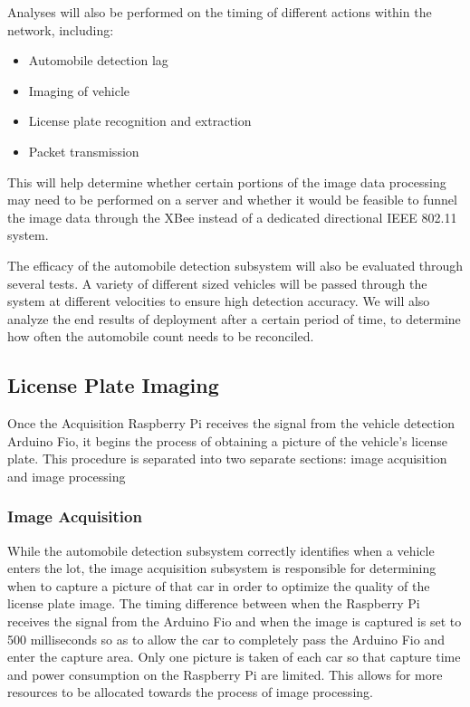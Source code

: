 \documentclass[11pt, oneside, fullpage, doublespace]{article}
\begin{document}
Analyses will also be performed on the timing of different actions within the network, including:
\begin{itemize}
\item Automobile detection lag
\item Imaging of vehicle
\item License plate recognition and extraction
\item Packet transmission
\end{itemize}
This will help determine whether certain portions of the image data processing may need to be performed on a server and whether it would be feasible to funnel the image data through the XBee instead of a dedicated directional IEEE 802.11 system.

The efficacy of the automobile detection subsystem will also be evaluated through several tests. A variety of different sized vehicles will be passed through the system at different velocities to ensure high detection accuracy. We will also analyze the end results of deployment after a certain period of time, to determine how often the automobile count needs to be reconciled.


\subsection{License Plate Imaging}
Once the Acquisition Raspberry Pi receives the signal from the vehicle detection Arduino Fio, it begins the process of obtaining a picture of the vehicle's license plate. This procedure is separated into two separate sections: image acquisition and image processing

\subsubsection{Image Acquisition}
While the automobile detection subsystem correctly identifies when a vehicle enters the lot, the image acquisition subsystem is responsible for determining when to capture a picture of that car in order to optimize the quality of the license plate image. The timing difference between when the Raspberry Pi receives the signal from the Arduino Fio and when the image is captured is set to 500 milliseconds so as to allow the car to completely pass the Arduino Fio and enter the capture area. Only one picture is taken of each car so that capture time and power consumption on the Raspberry Pi are limited. This allows for more resources to be allocated towards the process of image processing.
\end{document}
